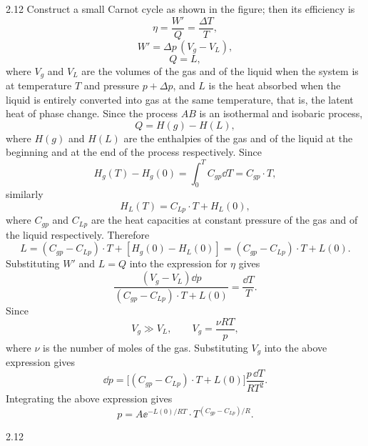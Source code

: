 \begin{solution}{2.12}
Construct a small Carnot cycle as shown in the figure; then its efficiency is
\[
\eta=\frac{W'}{Q}=\frac{\Delta T}{T},
\]
\[
W'=\Delta p\,(V_g-V_L),
\]
\[
Q=L,
\]
where $V_g$ and $V_L$ are the volumes of the gas and of the liquid when the system is at temperature $T$ and pressure $p+\Delta p$, and $L$ is the heat absorbed when the liquid is entirely converted into gas at the same temperature, that is, the latent heat of phase change. Since the process $AB$ is an isothermal and isobaric process,
\[
Q=H(g)-H(L),
\]
where $H(g)$ and $H(L)$ are the enthalpies of the gas and of the liquid at the beginning and at the end of the process respectively. Since
\[
H_g(T)-H_g(0)=\int_0^T C_{gp}\dd T=C_{gp}\cdot T,
\]
similarly
\[
H_L(T)=C_{Lp}\cdot T+H_L(0),
\]
where $C_{gp}$ and $C_{Lp}$ are the heat capacities at constant pressure of the gas and of the liquid respectively. Therefore
\[
L=(C_{gp}-C_{Lp})\cdot T+[H_g(0)-H_L(0)]=(C_{gp}-C_{Lp})\cdot T+L(0).
\]
Substituting $W'$ and $L=Q$ into the expression for $\eta$ gives
\[
\frac{(V_g-V_L)\dd p}{(C_{gp}-C_{Lp})\cdot T+L(0)}=\frac{\dd T}{T}.
\]
Since
\[
V_g\gg V_L,\qquad V_g=\frac{\nu RT}{p},
\]
where $\nu$ is the number of moles of the gas. Substituting $V_g$ into the above expression gives
\[
\dd p=\bigl[(C_{gp}-C_{Lp})\cdot T+L(0)\bigr]\frac{p\,\dd T}{R T^2}.
\]
Integrating the above expression gives
\[
p=A\ee^{-L(0)/RT}\cdot T^{(C_{gp}-C_{Lp})/R}.
\]

\begin{figbox}{2.12}
\end{figbox}
\end{solution}

